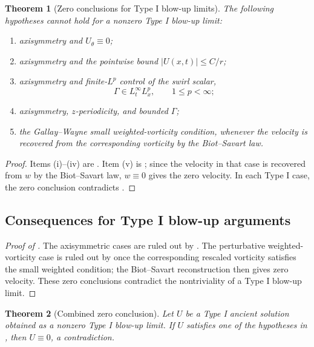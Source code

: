 \documentclass[11pt]{amsart}
\theoremstyle{plain}
\newtheorem{theorem}{Theorem}[section]
\theoremstyle{definition}
\theoremstyle{remark}
\numberwithin{equation}{section}
\begin{document}
\begin{theorem}[Zero conclusions for Type I blow-up limits]
\label{thm:typeI-zero-hypotheses}
The following hypotheses cannot hold for a nonzero Type I blow-up limit:
\begin{enumerate}[label=\textup{(\roman*)}]
\item axisymmetry and \(U_\theta\equiv0\);
\item axisymmetry and the pointwise bound \(|U(x,t)|\le C/r\);
\item axisymmetry and finite-\(L^p\) control of the swirl scalar,
\[
   \Gamma\in L_t^\infty L_x^p,\qquad 1\le p<\infty;
\]
\item axisymmetry, \(z\)-periodicity, and bounded \(\Gamma\);
\item the Gallay--Wayne small weighted-vorticity condition, whenever the
velocity is recovered from the corresponding vorticity by the Biot--Savart law.
\end{enumerate}
\end{theorem}

\begin{proof}
Items (i)--(iv) are .  Item (v) is
; since the velocity in that
case is recovered from \(w\) by the Biot--Savart law, \(w\equiv0\) gives the
zero velocity.  In each Type I case, the zero conclusion contradicts
.
\end{proof}

\subsection{Consequences for Type I blow-up arguments}

\begin{proof}[Proof of ]
The axisymmetric cases are ruled out by .  The
perturbative weighted-vorticity case is ruled out by
 once the corresponding rescaled
vorticity satisfies the small weighted condition; the Biot--Savart
reconstruction then gives zero velocity.  These zero conclusions contradict
the nontriviality of a Type I blow-up limit.
\end{proof}

\begin{theorem}[Combined zero conclusion]
\label{thm:stated-hypotheses-zero}
Let \(U\) be a Type I ancient solution obtained as a nonzero Type I blow-up
limit.  If \(U\) satisfies one of the hypotheses in
, then \(U\equiv0\), a contradiction.
\end{theorem}
\end{document}
